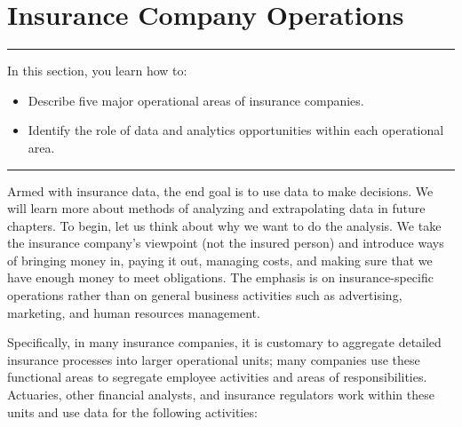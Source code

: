 \documentclass[
]{book}
\providecommand{\tightlist}{%
  \setlength{\itemsep}{0pt}\setlength{\parskip}{0pt}}
\begin{document}
\hypertarget{S:PredModApps}{%
\section{Insurance Company Operations}\label{S:PredModApps}}

\begin{center}\rule{0.5\linewidth}{0.5pt}\end{center}

In this section, you learn how to:

\begin{itemize}
\tightlist
\item
  Describe five major operational areas of insurance companies.
\item
  Identify the role of data and analytics opportunities within each operational area.
\end{itemize}

\begin{center}\rule{0.5\linewidth}{0.5pt}\end{center}

Armed with insurance data, the end goal is to use data to make decisions. We will learn more about methods of analyzing and extrapolating data in future chapters. To begin, let us think about why we want to do the analysis.
We take the insurance company's viewpoint (not the insured person) and introduce ways of bringing money in, paying it out, managing costs, and making sure that we have enough money to meet obligations. The emphasis is on insurance-specific operations rather than on general business activities such as advertising, marketing, and human resources management.

Specifically, in many insurance companies, it is customary to aggregate
detailed insurance processes into larger operational units; many
companies use these functional areas to segregate employee activities
and areas of responsibilities. Actuaries, other financial analysts, and insurance regulators work within these units and use data for the following activities:
\end{document}
